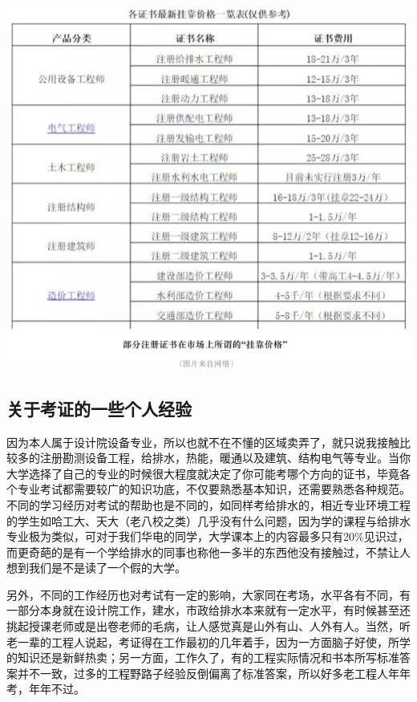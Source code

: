 \documentclass[]{book}
\begin{document}
\includegraphics[width=8.33in]{images/kaozheng3}

\hypertarget{ux5173ux4e8eux8003ux8bc1ux7684ux4e00ux4e9bux4e2aux4ebaux7ecfux9a8c}{%
\subsection{关于考证的一些个人经验}\label{ux5173ux4e8eux8003ux8bc1ux7684ux4e00ux4e9bux4e2aux4ebaux7ecfux9a8c}}

因为本人属于设计院设备专业，所以也就不在不懂的区域卖弄了，就只说我接触比较多的注册勘测设备工程，给排水，热能，暖通以及建筑、结构电气等专业。当你大学选择了自己的专业的时候很大程度就决定了你可能考哪个方向的证书，毕竟各个专业考试都需要较广的知识功底，不仅要熟悉基本知识，还需要熟悉各种规范。不同的学习经历对考试的帮助也是不同的，如同样考给排水的，相近专业环境工程的学生如哈工大、天大（老八校之类）几乎没有什么问题，因为学的课程与给排水专业极为类似，可对于我们华电的同学，大学课本上的内容最多只有20\%见识过，而更奇葩的是有一个学给排水的同事也称他一多半的东西他没有接触过，不禁让人想到我们是不是读了一个假的大学。

另外，不同的工作经历也对考试有一定的影响，大家同在考场，水平各有不同，有一部分本身就在设计院工作，建水，市政给排水本来就有一定水平，有时候甚至还挑起授课老师或是出卷老师的毛病，让人感觉真是山外有山、人外有人。当然，听老一辈的工程人说起，考证得在工作最初的几年着手，因为一方面脑子好使，所学的知识还是新鲜热卖；另一方面，工作久了，有的工程实际情况和书本所写标准答案并不一致，过多的工程野路子经验反倒偏离了标准答案，所以好多老工程人年年考，年年不过。
\end{document}
